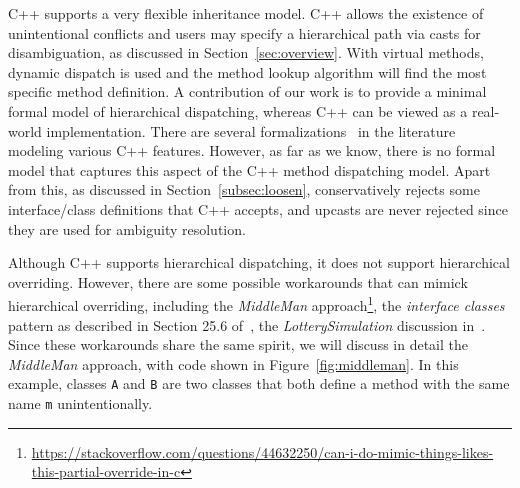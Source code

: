 C++ supports a very flexible inheritance model.
C++ allows the existence of unintentional conflicts and users may specify a hierarchical path via casts for disambiguation, as discussed in Section~\ref{sec:overview}. 
With virtual methods, dynamic dispatch is used and the 
method lookup algorithm will find the most specific method definition. 
A contribution of our work is to provide a minimal formal model of
hierarchical dispatching, whereas C++ can be viewed as a real-world
implementation. There are several
formalizations~\cite{Wasserrab2006,ramananandro2012mechanized,Ramalingam1997}
in the literature modeling various C++ features. However, as far as we know, there is no formal model that
captures this aspect of the C++ method dispatching model. Apart from this, as discussed in Section~\ref{subsec:loosen}, \name{} conservatively rejects some interface/class definitions that C++ accepts, and upcasts are never rejected since they are used for ambiguity resolution.

Although C++ supports hierarchical dispatching, it does not support
hierarchical overriding.  However, there are some possible
workarounds that can mimick hierarchical
overriding, including the \emph{MiddleMan} approach\footnote{\url{https://stackoverflow.com/questions/44632250/can-i-do-mimic-things-likes-this-partial-override-in-c}}, the \emph{interface classes} pattern as described in Section 25.6 of~\cite{stroustrup1995}, the \emph{LotterySimulation} discussion in~\cite{stroustrup1994design}. Since these workarounds share the same spirit, we will discuss in detail the \emph{MiddleMan} approach, with code shown in 
Figure~\ref{fig:middleman}. In this example, classes \texttt{A} and
\texttt{B} are two classes that both define a method with the same
name \texttt{m}
unintentionally.

